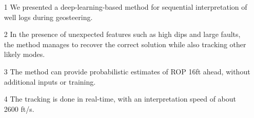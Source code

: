 
\begin{itemize}
\compresslist
	\item[1] We presented a deep-learning-based method for sequential interpretation of well logs during geosteering.
	\item[2] In the presence of unexpected features such as high dips and large faults, the method manages to recover the correct
solution while also tracking other likely modes.
	\item[3] The method can provide probabilistic estimates of ROP 16ft ahead, without additional inputs or training.
	\item[4] The tracking is done in real-time, with an interpretation speed of about 2600 ft/s.
\end{itemize}
